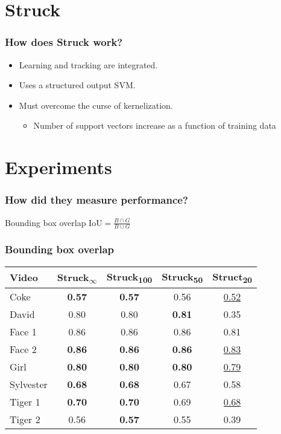 \documentclass[mathserif,handout]{beamer}
\begin{document}
\section{Struck}

\begin{frame}
    \frametitle{How does Struck work?}
    \begin{itemize}
        \item Learning and tracking are integrated.
        \item Uses a structured output SVM.
        \item Must overcome the \alert{curse of kernelization.}
            \begin{itemize}
                \item Number of support vectors increase as a function of training data
            \end{itemize}
    \end{itemize}
\end{frame}

\section{Experiments}

\begin{frame}
    \frametitle{How did they measure performance?}
    \begin{block}{Bounding box overlap}
        $\text{IoU} = \frac{B \cap G}{B \cup G}$
    \end{block}
\end{frame}

\begin{frame}
    \frametitle{Bounding box overlap}
    \begin{tabular}{l c c c c }
        \toprule
        Video & Struck\textsubscript{$\infty$} & Struck\textsubscript{100} & Struck\textsubscript{50} & Struct\textsubscript{20} \\
        \midrule
        Coke      & \textbf{0.57} & \textbf{0.57} &         0.56  & \underline{0.52} \\
        David     &         0.80  &         0.80  & \textbf{0.81} &            0.35  \\
        Face 1    &         0.86  &         0.86  &         0.86  &            0.81  \\
        Face 2    & \textbf{0.86} & \textbf{0.86} & \textbf{0.86} & \underline{0.83} \\
        Girl      & \textbf{0.80} & \textbf{0.80} & \textbf{0.80} & \underline{0.79} \\
        Sylvester & \textbf{0.68} & \textbf{0.68} &         0.67  &            0.58  \\
        Tiger 1   & \textbf{0.70} & \textbf{0.70} &         0.69  & \underline{0.68} \\
        Tiger 2   &         0.56  & \textbf{0.57} &         0.55  &            0.39  \\
        \bottomrule
    \end{tabular}
\end{frame}
\end{document}
